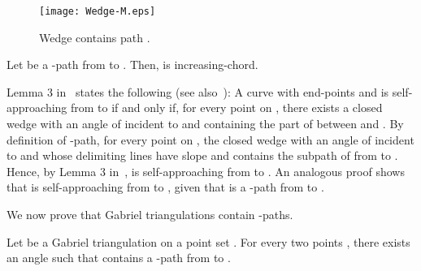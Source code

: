 \documentclass{llncs}
\newcommand{\remove}[1]{}
\renewenvironment{proof}
{{\bf Proof:}}{\hspace*{\fill}\par\vspace{2mm}}
\begin{document}
\begin{figure}[tb]
\begin{center}
\mbox{\texttt{[image: Wedge-M.eps]}}
\caption{Wedge  contains path .}
\label{fig:wedges}
\end{center}
\end{figure}

\begin{lemma} \label{le:theta-path-approaching}
Let  be a -path from  to . Then,  is increasing-chord.
\end{lemma}

\begin{proof}
Lemma 3 in~\cite{ikl-sac-99} states the following (see also~\cite{aaiklr-gsac-01}): A curve  with end-points  and  is self-approaching from  to  if and only if, for every point  on , there exists a closed wedge with an angle of  incident to  and containing the part of  between  and .
By definition of -path, for every point  on , the closed wedge  with an angle of  incident to  and whose delimiting lines have slope  and  contains the subpath  of  from  to . Hence, by Lemma 3 in~\cite{ikl-sac-99},  is self-approaching from  to .
An analogous proof shows that  is self-approaching from  to , given that  is a -path from  to .
\remove{We prove that  is self-approaching from  to . The proof that  is self-approaching from  to  is analogous, as  is a -path from  to .

Consider any three points , , and  on  in this order from  to . Assume that , , and  appear in this counter-clockwise order along triangle , the case in which they appear in clockwise order , , and  is analogous. In order to prove that  it suffices to prove that . Since  is in  and since  is in , we have that , where  is the intersection point of  with the line delimiting  with slope . Moreover, , given that  is the supplementary  of the angle obtained by counter-clockwise rotating  until it coincides with the line delimiting  with slope . The latter angle is smaller than or equal to , given that it is not larger than the angle of wedge . This proves that  is self-approaching from  to , and hence it proves the lemma.
}
\end{proof}

\remove{
}
We now prove that Gabriel triangulations contain -paths.

\begin{lemma} \label{le:gabriel-is-theta}
Let  be a Gabriel triangulation on a point set . For every two points , there exists an angle  such that  contains a -path from  to .
\end{lemma}
\end{document}
